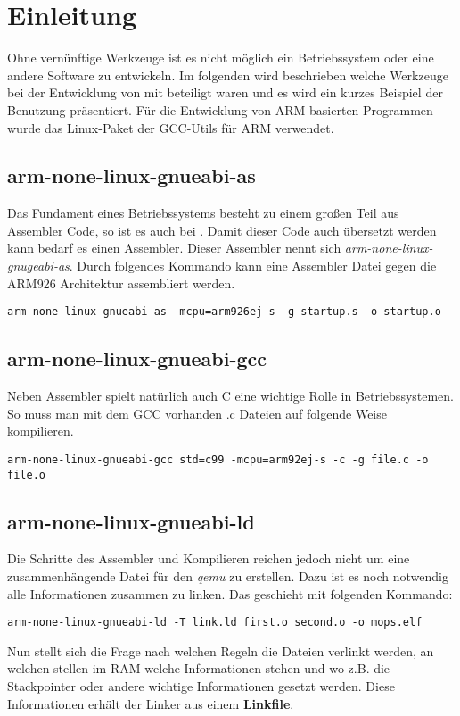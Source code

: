 \section{Einleitung}
Ohne  vern\"unftige Werkzeuge ist es nicht m\"oglich ein Betriebssystem oder eine andere Software zu entwickeln. Im folgenden wird beschrieben welche Werkzeuge bei der Entwicklung von \mops mit beteiligt waren und es wird ein kurzes Beispiel der Benutzung pr\"asentiert. F\"ur die Entwicklung von ARM-basierten Programmen wurde das Linux-Paket der GCC-Utils f\"ur ARM verwendet. 

\subsection{arm-none-linux-gnueabi-as}
Das Fundament eines Betriebssystems besteht zu einem gro\ss en Teil aus Assembler Code, so ist es auch bei \mops. Damit dieser Code auch \"ubersetzt werden kann bedarf es einen Assembler. Dieser Assembler nennt sich \textit{arm-none-linux-gnugeabi-as}. Durch folgendes Kommando kann eine Assembler Datei gegen die ARM926 Architektur assembliert werden. \\

\begin{lstlisting}[caption={ARM-Assembler mit Optionen f\"ur ARM926}]
arm-none-linux-gnueabi-as -mcpu=arm926ej-s -g startup.s -o startup.o
\end{lstlisting}

\subsection{arm-none-linux-gnueabi-gcc}
Neben Assembler spielt nat\"urlich auch C eine wichtige Rolle in Betriebssystemen. So muss man mit dem GCC vorhanden .c Dateien auf folgende Weise kompilieren. 
\begin{lstlisting}[caption={C/C++ Compiler}]
arm-none-linux-gnueabi-gcc std=c99 -mcpu=arm92ej-s -c -g file.c -o file.o
\end{lstlisting}
\subsection{arm-none-linux-gnueabi-ld}
Die Schritte des Assembler und Kompilieren reichen jedoch nicht um eine zusammenh\"angende Datei f\"ur den \textit{qemu} zu erstellen. Dazu ist es noch notwendig alle Informationen zusammen zu linken. Das geschieht mit folgenden Kommando:

\begin{lstlisting}[caption={Linker mit Link-File 'link.ld'}]
arm-none-linux-gnueabi-ld -T link.ld first.o second.o -o mops.elf
\end{lstlisting}
Nun stellt sich die Frage nach welchen Regeln die Dateien verlinkt werden, an welchen stellen im RAM welche Informationen stehen und wo z.B. die Stackpointer oder andere wichtige Informationen gesetzt werden. Diese Informationen erh\"alt der Linker aus einem \textbf{Linkfile}.
